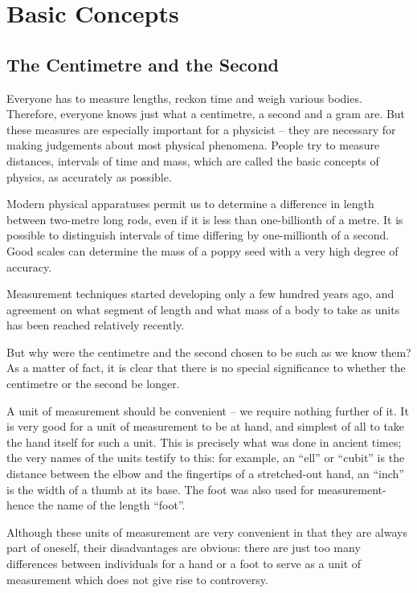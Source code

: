 

\cleardoublepage
\chapter{Basic Concepts}
\label{ch-basic-concepts}

\section{The Centimetre and the Second}

Everyone has to measure lengths, reckon time and weigh various
bodies. Therefore, everyone knows just what a centimetre, a second and
a gram are. But these measures are especially important for a
physicist -- they are necessary for making judgements about most physical
phenomena. People try to measure distances, intervals of time and
mass, which are called the basic concepts of physics, as accurately as
possible.  


Modern physical apparatuses permit us to determine a difference in
length between two-metre long rods, even if it is less than
one-billionth of a metre. It is possible to distinguish intervals of
time differing by one-millionth of a second. Good scales can determine
the mass of a poppy seed with a very high degree of accuracy.

Measurement techniques started developing only a few hundred years
ago, and agreement on what segment of length and what mass of a body
to take as units has been reached relatively recently.  

But why were the centimetre and the second chosen to be such as we
know them? As a matter of fact, it is clear that there is no special
significance to whether the centimetre or the second be longer.  

A unit of measurement should be convenient -- we require nothing
further of it. It is very good for a unit of measurement to be at
hand, and simplest of all to take the hand itself for such a
unit. This is precisely what was done in ancient times; the very names
of the units testify to this: for example, an ``ell'' or ``cubit'' is the
distance between the elbow and the fingertips of a stretched-out hand,
an ``inch'' is the width of a thumb at its base. The foot was also used
for measurement-hence the name of the length ``foot''.

Although these units of measurement are very convenient in that they
are always part of oneself, their disadvantages are obvious: there
are just too many differences between individuals for a hand or a
foot to serve as a unit of measurement which does not give rise to
controversy.

